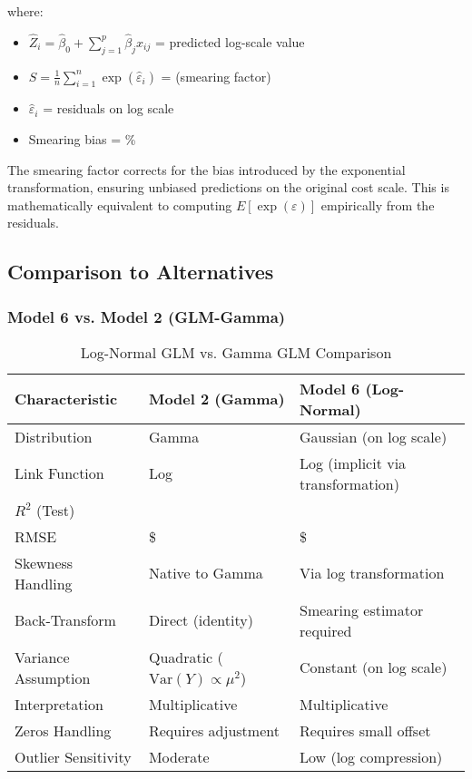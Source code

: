 where:
\begin{itemize}
    \item $\hat{Z}_i = \hat{\beta}_0 + \sum_{j=1}^{p} \hat{\beta}_j x_{ij}$ = predicted log-scale value
    \item $S = \frac{1}{n}\sum_{i=1}^{n}\exp(\hat{\varepsilon}_i)$ = \ModelSixSmearingFactor{} (smearing factor)
    \item $\hat{\varepsilon}_i$ = residuals on log scale
    \item Smearing bias = \ModelSixSmearingBias{}\%
\end{itemize}

The smearing factor corrects for the bias introduced by the exponential transformation, ensuring unbiased predictions on the original cost scale. This is mathematically equivalent to computing $E[\exp(\varepsilon)]$ empirically from the residuals.

\subsection{Comparison to Alternatives}

\subsubsection{Model 6 vs. Model 2 (GLM-Gamma)}

\begin{table}[h]
\centering
\caption{Log-Normal GLM vs. Gamma GLM Comparison}
\begin{tabular}{lll}
\toprule
\textbf{Characteristic} & \textbf{Model 2 (Gamma)} & \textbf{Model 6 (Log-Normal)} \\
\midrule
Distribution & Gamma & Gaussian (on log scale) \\
Link Function & Log & Log (implicit via transformation) \\
$R^2$ (Test) & \ModelTwoRSquaredTest{} & \MRSquaredTest{} \\
RMSE & \$\ModelTwoRMSETest{} & \$\MRMSETest{} \\
Skewness Handling & Native to Gamma & Via log transformation \\
Back-Transform & Direct (identity) & Smearing estimator required \\
Variance Assumption & Quadratic ($\text{Var}(Y) \propto \mu^2$) & Constant (on log scale) \\
Interpretation & Multiplicative & Multiplicative \\
Zeros Handling & Requires adjustment & Requires small offset \\
Outlier Sensitivity & Moderate & Low (log compression) \\
\bottomrule
\end{tabular}
\end{table}

